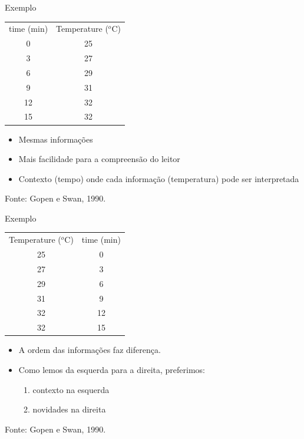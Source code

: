 \documentclass{beamer}
\begin{document}
\begin{frame}{Exemplo}
  \begin{example}
    \begin{tabular}{cc}
      time (min) & Temperature ($^o$C) \\
      0 & 25 \\
      3 & 27 \\
      6 & 29 \\
      9 & 31 \\
      12 & 32 \\
      15 & 32 \\
    \end{tabular}
  \end{example}
  \begin{itemize}
  \item<1-> Mesmas informações
  \item Mais facilidade para a compreensão do leitor
  \item \alert{Contexto} (tempo) onde cada \alert{informação}
    (temperatura) pode ser interpretada
  \end{itemize}
\vfill
  Fonte: Gopen e Swan, 1990.
\end{frame}

\begin{frame}{Exemplo}
  \begin{example}
    \begin{tabular}{cc}
      Temperature ($^o$C) & time (min) \\
      25 & 0 \\
      27 & 3 \\
      29 & 6\\
      31 & 9\\
      32 & 12\\
      32 & 15 \\
    \end{tabular}
  \end{example}
  \begin{itemize}
  \item A \alert{ordem} das informações faz diferença.
  \item Como lemos da esquerda para a direita, preferimos:
    \begin{enumerate}
    \item contexto na esquerda
    \item novidades na direita
    \end{enumerate}
  \end{itemize}

  \vfill
  Fonte: Gopen e Swan, 1990.
\end{frame}
\end{document}
